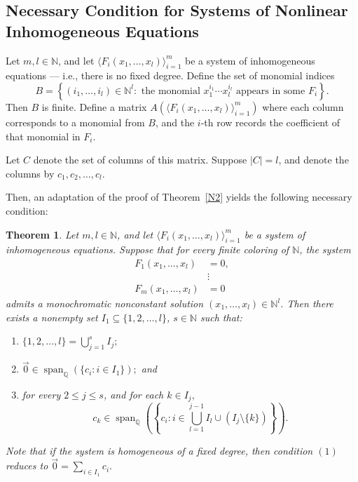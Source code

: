 \documentclass{article}
\theoremstyle{Theorem}
\newtheorem{thm}{Theorem}[section]
\theoremstyle{definition}
\newcommand{\N}{\mathbb{N}}
\begin{document}
\subsection{Necessary Condition for Systems of Nonlinear Inhomogeneous Equations}

Let \( m, l \in \mathbb{N} \), and let \( \langle F_i(x_1, \ldots, x_l) \rangle_{i=1}^m \) be a system of inhomogeneous equations — i.e., there is no fixed degree. Define the set of monomial indices
\[
B = \left\{ (i_1, \ldots, i_l) \in \mathbb{N}^l : \text{ the monomial } x_1^{i_1} \cdots x_l^{i_l} \text{ appears in some } F_i \right\}.
\]
Then \( B \) is finite. Define a matrix \( A\left( \langle F_i(x_1, \ldots, x_l) \rangle_{i=1}^m \right) \) where each column corresponds to a monomial from \( B \), and the \( i \)-th row records the coefficient of that monomial in \( F_i \).

Let \( C \) denote the set of columns of this matrix. Suppose \( |C| = l \), and denote the columns by \( c_1, c_2, \ldots, c_l \).

Then, an adaptation of the proof of Theorem~\ref{N2} yields the following necessary condition:

\begin{thm}\label{just1}
Let \( m, l \in \mathbb{N} \), and let \( \langle F_i(x_1, \ldots, x_l) \rangle_{i=1}^m \) be a system of inhomogeneous equations. Suppose that for every finite coloring of \( \mathbb{N} \), the system
\begin{align*}
    F_1(x_1, \ldots, x_l) &= 0, \\
    &\vdots \\
    F_m(x_1, \ldots, x_l) &= 0
\end{align*}
admits a monochromatic nonconstant solution \( (x_1, \ldots, x_l) \in \mathbb{N}^l \). Then there exists a nonempty set \( I_1 \subseteq \{1, 2, \ldots, l\} \), $s\in \N$ such that:
\begin{enumerate}
\item $\{1,2,\ldots ,l\}=\bigcup_{j=1}^sI_j;$
    \item $\vec 0 \in \operatorname{span}_{\mathbb{Q}} \left( \{ c_i : i \in I_1 \} \right);$ and
    \item for every \(2\leq j\leq s\), and for each $k\in I_j,$ 
    \[
    c_k \in \operatorname{span}_{\mathbb{Q}} \left( \left\lbrace c_i : i \in \bigcup_{l=1}^{j-1}I_l\cup (I_j\setminus \{k\}) \right\rbrace \right).
    \]
    
    
   
\end{enumerate}

Note that if the system is homogeneous of a fixed degree, then condition $(1)$ reduces to $\vec 0=\sum_{i\in I_1}c_i.$
\end{thm}
\end{document}
